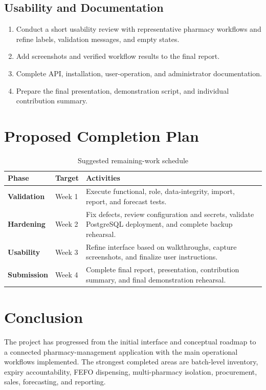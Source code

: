 \documentclass[12pt,a4paper]{article}
\begin{document}
\subsection{Usability and Documentation}
\begin{enumerate}[leftmargin=*]
    \item Conduct a short usability review with representative pharmacy
    workflows and refine labels, validation messages, and empty states.
    \item Add screenshots and verified workflow results to the final report.
    \item Complete API, installation, user-operation, and administrator
    documentation.
    \item Prepare the final presentation, demonstration script, and individual
    contribution summary.
\end{enumerate}

\section{Proposed Completion Plan}
\begin{table}[h]
\centering
\begin{tabularx}{\textwidth}{>{\bfseries}p{}p{}X}
\toprule
\textbf{Phase} & \textbf{Target} & \textbf{Activities} \\
\midrule
Validation & Week 1 & Execute functional, role, data-integrity, import, report, and forecast tests. \\
Hardening & Week 2 & Fix defects, review configuration and secrets, validate PostgreSQL deployment, and complete backup rehearsal. \\
Usability & Week 3 & Refine interface based on walkthroughs, capture screenshots, and finalize user instructions. \\
Submission & Week 4 & Complete final report, presentation, contribution summary, and final demonstration rehearsal. \\
\bottomrule
\end{tabularx}
\caption{Suggested remaining-work schedule}
\end{table}

\section{Conclusion}
The project has progressed from the initial interface and conceptual roadmap to
a connected pharmacy-management application with the main operational
workflows implemented. The strongest completed areas are batch-level
inventory, expiry accountability, FEFO dispensing, multi-pharmacy isolation,
procurement, sales, forecasting, and reporting.
\end{document}
